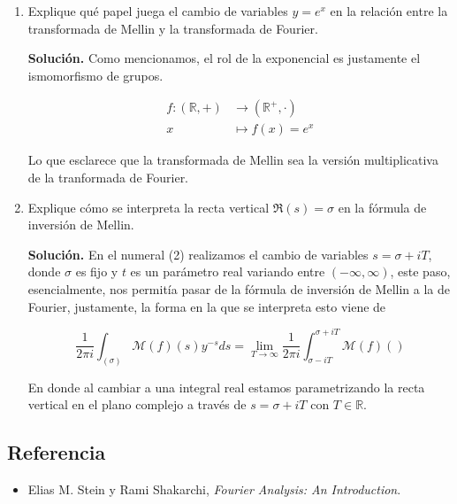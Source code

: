 \documentclass[12pt, a4paper]{article}
\begin{document}
\begin{enumerate}
$$\int_a^b \frac{dy}{y},$$

note que si $ky=x$, entonces $kdy=dx$, esto concluye que $\dfrac{dy}{y}=\dfrac{dx}{x}$, así pues

$$\int_{ka}^{kb} \frac{dx}{x}=\int_a^b\frac{dy}{y}$$

\item Explique qué papel juega el cambio de variables $y = e^x$ en la relación entre la transformada de Mellin y la transformada de Fourier.

\textbf{Solución.} Como mencionamos, el rol de la exponencial es justamente el ismomorfismo de grupos.

\begin{align*}
  f : (\mathbb{R},+) &\longrightarrow (\mathbb{R}^+,\cdot) \\
  x &\longmapsto f(x) = e^x
\end{align*}

Lo que esclarece que la transformada de Mellin sea la versión multiplicativa de la tranformada de Fourier.

\item Explique cómo se interpreta la recta vertical $\Re(s)=\sigma$ en la fórmula de inversión de Mellin.

\textbf{Solución.} En el numeral (2) realizamos el cambio de variables $s=\sigma+iT$, donde $\sigma$ es fijo y $t$ es un parámetro real variando entre $(-\infty,\infty)$, este paso, esencialmente, nos permitía pasar de la fórmula de inversión de Mellin a la de Fourier, justamente, la forma en la que se interpreta esto viene de

$$\dfrac{1}{2\pi i}\int_{(\sigma)}\mathcal{M}(f)(s)y^{-s}ds=\lim_{T \to \infty} \frac{1}{2\pi i}\int_{\sigma -iT}^{\sigma +iT}\mathcal{M}(f)()$$

En donde al cambiar a una integral real estamos parametrizando la recta vertical en el plano complejo a través de $s=\sigma+iT$ con $T\in \mathbb{R}$.
\end{enumerate}
\subsection*{Referencia}

\begin{itemize}
  \item Elias M. Stein y Rami Shakarchi, \textit{Fourier Analysis: An Introduction}. 
\end{itemize}
\end{document}
